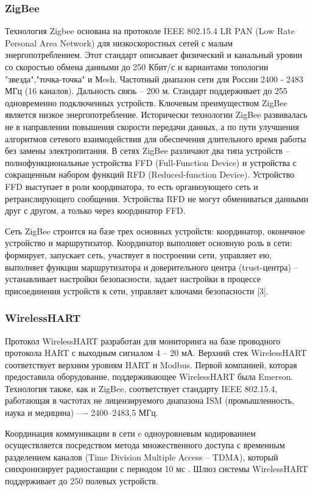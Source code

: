 \subsubsection{ZigBee}
Технология Zigbee основана на протоколе IEEE 802.15.4 LR PAN (Low Rate Personal Area Network) для низкоскоростных сетей с малым энергопотреблением. Этот стандарт описывает физический и канальный уровни со скоростью обмена данными до 250 Кбит/с и вариантами топологии "звезда","точка-точка" и Мesh. Частотный диапазон сети для России 2400 - 2483 МГц (16 каналов). Дальность связь -- 200 м. Стандарт поддерживает до 255 одновременно подключенных устройств. Ключевым преимуществом ZigBee является низкое энергопотребление. Исторически технологии ZigBee развивалась не в направлении повышения скорости передачи данных, а по пути улучшения алгоритмов сетевого взаимодействия для обеспечения длительного время работы без замены электропитания.  В сетях ZigBee различают два типа устройств -- полнофункциональные устройства FFD (Full-Function Device) и устройства с сокращенным набором функций  RFD (Reduced-function Device). Устройство FFD выступает в роли координатора, то есть организующего сеть и ретранслирующего сообщения. Устройства RFD не могут обмениваться данными друг с другом, а только через координатор FFD.

Сеть ZigBee строится на базе трех основных устройств: координатор, оконечное
устройство и маршрутизатор. Координатор выполняет основную роль в сети: формирует,
запускает сеть, участвует в построении сети, управляет ею, выполняет функции
маршрутизатора и доверительного центра (trust-центра) – устанавливает настройки
безопасности, задает настройки в процессе присоединения устройств к сети, управляет
ключами безопасности [3]. 

\subsubsection{WirelessHART}


Протокол WirelessHART разработан для мониторинга на базе проводного протокола HART с выходным сигналом 4 -- 20 мА. Верхний стек WirelessHART соответствует верхним уровням HART и Modbus. Первой компанией, которая предоставила оборудование, поддерживающее WirelessHART была Emerson. Технология также, как и ZigBee, соответствует стандарту IEEE 802.15.4, работающая в частотах не лицензируемого диапазона ISM (промышленность, наука и медицина) —- 2400–2483,5 МГц.

Координация коммуникации в сети c одноуровневым кодированием осуществляется посредством метода множественного доступа с временным разделением каналов (Time Division Multiple Access – TDMA), который синхронизирует радиостанции с периодом 10 мс \cite{Chupaev2018}. Шлюз системы WirelessHART поддерживает до 250 полевых устройств. 

